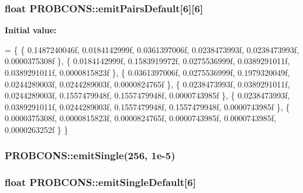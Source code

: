 \hypertarget{namespace_p_r_o_b_c_o_n_s_a7b7f8e2ed1d48ae7f4003a455d3f7150}{
\subsubsection[{emit\+Pairs\+Default}]{\setlength{\rightskip}{0pt plus 5cm}float P\+R\+O\+B\+C\+O\+N\+S\+::emit\+Pairs\+Default\mbox{[}6\mbox{]}\mbox{[}6\mbox{]}}}\label{namespace_p_r_o_b_c_o_n_s_a7b7f8e2ed1d48ae7f4003a455d3f7150}
{\bfseries Initial value\+:}
\begin{DoxyCode}
= \{
  \{ 0.1487240046f, 0.0184142999f, 0.0361397006f, 0.0238473993f, 0.0238473993f, 0.0000375308f \},
  \{ 0.0184142999f, 0.1583919972f, 0.0275536999f, 0.0389291011f, 0.0389291011f, 0.0000815823f \},
  \{ 0.0361397006f, 0.0275536999f, 0.1979320049f, 0.0244289003f, 0.0244289003f, 0.0000824765f \},
  \{ 0.0238473993f, 0.0389291011f, 0.0244289003f, 0.1557479948f, 0.1557479948f, 0.0000743985f \},
  \{ 0.0238473993f, 0.0389291011f, 0.0244289003f, 0.1557479948f, 0.1557479948f, 0.0000743985f \},
  \{ 0.0000375308f, 0.0000815823f, 0.0000824765f, 0.0000743985f, 0.0000743985f, 0.0000263252f \}
\}
\end{DoxyCode}
\hypertarget{namespace_p_r_o_b_c_o_n_s_a60ce52cd8ccb26631e13fecca788f13e}{
\subsubsection[{emit\+Single}]{ P\+R\+O\+B\+C\+O\+N\+S\+::emit\+Single(256, 1e-\/5)}}\label{namespace_p_r_o_b_c_o_n_s_a60ce52cd8ccb26631e13fecca788f13e}
\hypertarget{namespace_p_r_o_b_c_o_n_s_ae1a79b9f9d56a9e4a4fb4549fbfd8c26}{
\subsubsection[{emit\+Single\+Default}]{\setlength{\rightskip}{0pt plus 5cm}float P\+R\+O\+B\+C\+O\+N\+S\+::emit\+Single\+Default\mbox{[}6\mbox{]}}}\label{namespace_p_r_o_b_c_o_n_s_ae1a79b9f9d56a9e4a4fb4549fbfd8c26}
